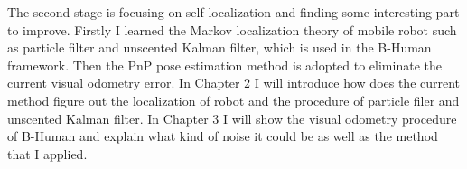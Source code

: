 The second stage is focusing on self-localization and finding some interesting part to improve. Firstly I learned the Markov localization theory of mobile robot such as particle filter and unscented Kalman filter, which is used in the B-Human framework. Then the PnP pose estimation method is adopted to eliminate the current visual odometry error. In Chapter 2 I will introduce how does the current method figure out the localization of robot and the procedure of particle filer and unscented Kalman filter. In Chapter 3 I will show the visual odometry procedure of B-Human and explain what kind of noise it could be as well as the method that I applied.
